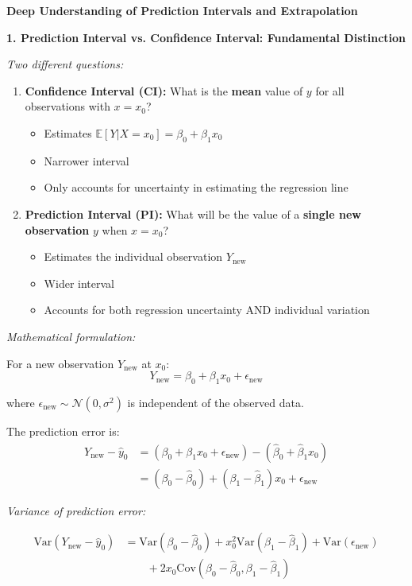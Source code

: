 \documentclass[12pt]{article}
\begin{document}
\begin{explanation}
\textbf{Deep Understanding of Prediction Intervals and Extrapolation}

\textbf{1. Prediction Interval vs. Confidence Interval: Fundamental Distinction}

\textit{Two different questions:}

\begin{enumerate}
    \item \textbf{Confidence Interval (CI):} What is the \textbf{mean} value of $y$ for all observations with $x = x_0$?
    \begin{itemize}
        \item Estimates $\mathbb{E}[Y|X = x_0] = \beta_0 + \beta_1 x_0$
        \item Narrower interval
        \item Only accounts for uncertainty in estimating the regression line
    \end{itemize}

    \item \textbf{Prediction Interval (PI):} What will be the value of a \textbf{single new observation} $y$ when $x = x_0$?
    \begin{itemize}
        \item Estimates the individual observation $Y_{\text{new}}$
        \item Wider interval
        \item Accounts for both regression uncertainty AND individual variation
    \end{itemize}
\end{enumerate}

\textit{Mathematical formulation:}

For a new observation $Y_{\text{new}}$ at $x_0$:
\[
Y_{\text{new}} = \beta_0 + \beta_1 x_0 + \epsilon_{\text{new}}
\]

where $\epsilon_{\text{new}} \sim \mathcal{N}(0, \sigma^2)$ is independent of the observed data.

The prediction error is:
\begin{align*}
Y_{\text{new}} - \hat{y}_0 &= (\beta_0 + \beta_1 x_0 + \epsilon_{\text{new}}) - (\hat{\beta}_0 + \hat{\beta}_1 x_0) \\
&= (\beta_0 - \hat{\beta}_0) + (\beta_1 - \hat{\beta}_1)x_0 + \epsilon_{\text{new}}
\end{align*}

\textit{Variance of prediction error:}

\begin{align*}
\text{Var}(Y_{\text{new}} - \hat{y}_0) &= \text{Var}(\beta_0 - \hat{\beta}_0) + x_0^2\text{Var}(\beta_1 - \hat{\beta}_1) + \text{Var}(\epsilon_{\text{new}}) \\
&\qquad + 2x_0\text{Cov}(\beta_0 - \hat{\beta}_0, \beta_1 - \hat{\beta}_1)
\end{align*}


\end{explanation}
\end{document}
